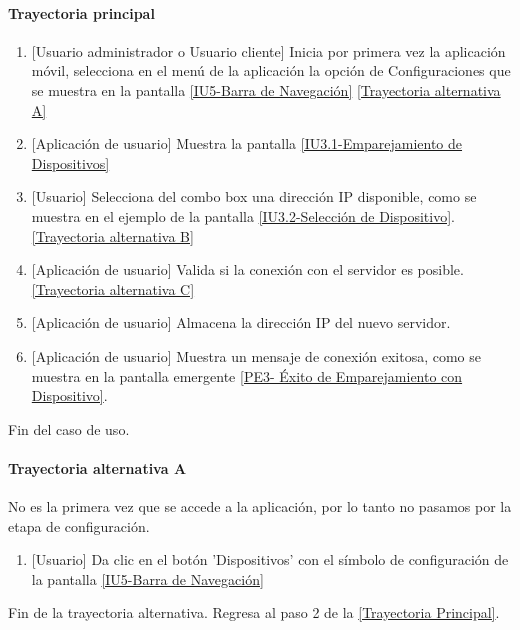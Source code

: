 \paragraph{Trayectoria principal} \label{SUB-U-CU1.4:TP}
	\begin{enumerate}
		\item {[Usuario administrador o Usuario cliente]} Inicia por primera vez la aplicación móvil, selecciona en el menú de la aplicación la opción de Configuraciones que se muestra en la pantalla \hyperref[fig:Barra de navegacion]{[IU5-Barra de Navegación]} \hyperref[SUB-U-CU1.4:TA]{[Trayectoria alternativa A]} %
		\item {[Aplicación de usuario]} Muestra la pantalla \hyperref[fig:Emparejamiento Dispositivos]{[IU3.1-Emparejamiento de Dispositivos]}
		\item  {[Usuario]} Selecciona del combo box una dirección IP disponible, como se muestra en el ejemplo de la pantalla \hyperref[fig:Seleccion de Disposotivo]{[IU3.2-Selección de Dispositivo]}. \hyperref[SUB-U-CU1.4:TB]{[Trayectoria alternativa B]}
		\item {[Aplicación de usuario]} Valida si la conexión con el servidor es posible. \hyperref[SUB-U-CU1.4:TC]{[Trayectoria alternativa C]}
		\item {[Aplicación de usuario]} Almacena la dirección IP del nuevo servidor.
		\item {[Aplicación de usuario]} Muestra un mensaje de conexión exitosa, como se muestra en la pantalla emergente \hyperref[fig:Exito Emparejamiento]{[PE3- Éxito de Emparejamiento con Dispositivo]}.
	\end{enumerate}
	Fin del caso de uso.

\paragraph{Trayectoria alternativa A} \label{SUB-U-CU1.4:TA}
	No es la primera vez que se accede a la aplicación, por lo tanto no pasamos por la etapa de configuración.
	\begin{enumerate}[label=A\arabic*.]
		\item {[Usuario]} Da clic en el botón 'Dispositivos' con el símbolo de configuración de la pantalla \hyperref[fig:Barra de navegacion]{[IU5-Barra de Navegación]}
	\end{enumerate}
	Fin de la trayectoria alternativa. Regresa al paso 2 de la \hyperref[SUB-U-CU1.4:TP]{[Trayectoria Principal]}.
	
